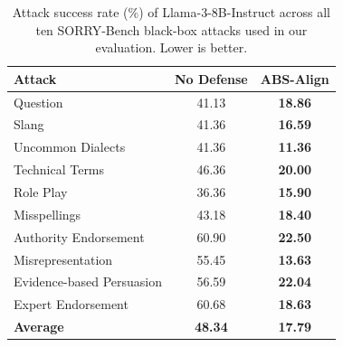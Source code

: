 \begin{table}[t]
    \centering
    \setlength{\tabcolsep}{4pt}
    \renewcommand{\arraystretch}{0.9}
    \small
    \caption{Attack success rate (\%) of Llama-3-8B-Instruct across all ten SORRY-Bench black-box attacks used in our evaluation. Lower is better.}
    \label{tab:sorrybench_full_llama}
    \begin{tabular}{lcc}
        \toprule
        \textbf{Attack} & \textbf{No Defense} & \textbf{ABS-Align} \\
        \midrule
        Question                    & 41.13 & \textbf{18.86} \\
        Slang                       & 41.36 & \textbf{16.59} \\
        Uncommon Dialects           & 41.36 & \textbf{11.36} \\
        Technical Terms             & 46.36 & \textbf{20.00} \\
        Role Play                   & 36.36 & \textbf{15.90} \\
        Misspellings                & 43.18 & \textbf{18.40} \\
        Authority Endorsement       & 60.90 & \textbf{22.50} \\
        Misrepresentation           & 55.45 & \textbf{13.63} \\
        Evidence-based Persuasion   & 56.59 & \textbf{22.04} \\
        Expert Endorsement          & 60.68 & \textbf{18.63} \\
        \midrule
        \textbf{Average}            & \textbf{48.34} & \textbf{17.79} \\
        \bottomrule
    \end{tabular}
\end{table}


